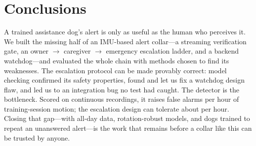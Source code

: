 \section{Conclusions}
\label{sec:conclusions}

A trained assistance dog's alert is only as useful as the human who perceives it. We built the missing half of an IMU-based alert collar---a streaming verification gate, an owner $\rightarrow$ caregiver $\rightarrow$ emergency escalation ladder, and a backend watchdog---and evaluated the whole chain with methods chosen to find its weaknesses. The escalation protocol can be made provably correct: model checking confirmed its safety properties, found and let us fix a watchdog design flaw, and led us to an integration bug no test had caught. The detector is the bottleneck. Scored on continuous recordings, it raises  false alarms per hour of training-session motion; the escalation design can tolerate about  per hour. Closing that gap---with all-day data, rotation-robust models, and dogs trained to repeat an unanswered alert---is the work that remains before a collar like this can be trusted by anyone.
